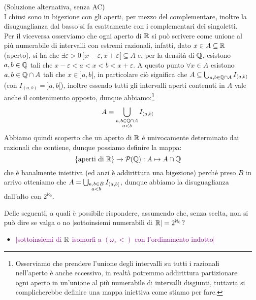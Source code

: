 \begin{soln}
	(Soluzione alternativa, senza AC)\\
	I chiusi sono in bigezione con gli aperti, per mezzo del complementare, inoltre la disuguaglianza dal basso si fa esattamente con i complementari dei singoletti.\\ Per il viceversa osserviamo che ogni aperto di $\mathbb R$ si può scrivere come unione al più numerabile di intervalli con estremi razionali,
	infatti, dato $x \in A \subseteq \mathbb R$ (aperto), si ha che $\exists\varepsilon > 0 \; ]x - \varepsilon, x + \varepsilon[ \subseteq A$ e, per la densità di $\mathbb Q$, esistono $a,b \in \mathbb Q$ tali che $x - \varepsilon < a < x < b < x + \varepsilon$.
	A questo punto $\forall x \in A$ esistono $a,b \in \mathbb Q \cap A$ tali che $x \in ]a,b[$, in particolare ciò significa che $A \subseteq \bigcup_{a,b \in \mathbb Q \cap A} I_{(a,b)}$ (con $I_{(a,b)} = ]a,b[$), inoltre essendo tutti gli intervalli aperti contenuti in $A$ vale anche il contenimento opposto, dunque abbiamo:\footnote{Osserviamo che prendere l'unione degli intervalli su tutti i razionali nell'aperto è anche eccessivo, in realtà potremmo addirittura partizionare ogni aperto in un'unione al più numerabile di intervalli disgiunti, tuttavia si complicherebbe definire una mappa iniettiva come stiamo per fare.}
	\[ A = \bigcup_{\begin{subarray}{c}a,b \in \mathbb Q \cap A\\ a < b\end{subarray}} I_{(a,b)}
		\]
	Abbiamo quindi scoperto che un aperto di $\mathbb R$ è univocamente determinato dai razionali che contiene, dunque possiamo definire la mappa:
	\[ \{\text{aperti di $\mathbb R$}\} \to \mathcal{P}(\mathbb Q) : A \mapsto A \cap \mathbb Q 
		\]
	che è banalmente iniettiva (ed anzi è addirittura una bigezione) perché preso $B$ in arrivo otteniamo che $A = \bigcup_{\begin{subarray}{c}a,b \in B\\ a < b\end{subarray}} I_{(a,b)}$, dunque abbiamo la disuguaglianza dall'alto con $2^{\aleph_0}$.
\end{soln}

\pagebreak
\begin{exercise}
	Delle seguenti, a quali è possibile rispondere, assumendo che, senza scelta, non si può dire se valga o no $|$sottoinsiemi numerabili di $\mathbb R| =2^{\aleph_0}$?
\end{exercise}

\begin{itemize}
	\item \textcolor{purple}{$|$sottoinsiemi di $\mathbb R$ isomorfi a $(\omega,<)$ con l'ordinamento indotto$|$}
\end{itemize}

